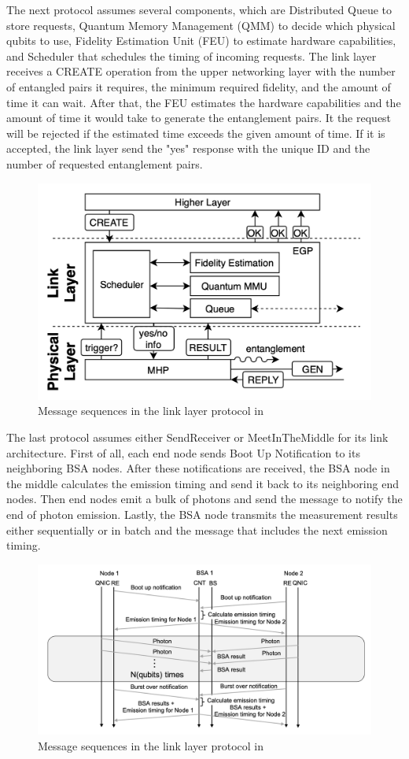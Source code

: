 The next protocol \cite{Dahlberg_2019} assumes several components, which are Distributed Queue to store requests, Quantum Memory Management (QMM) to decide which physical qubits to use, Fidelity Estimation Unit (FEU) to estimate hardware capabilities, and Scheduler that schedules the timing of incoming requests.
The link layer receives a CREATE operation from the upper networking layer with the number of entangled pairs it requires, the minimum required fidelity, and the amount of time it can wait.
After that, the FEU estimates the hardware capabilities and the amount of time it would take to generate the entanglement pairs.  It the request will be rejected if the estimated time exceeds the given amount of time.
If it is accepted, the link layer send the "yes" response with the unique ID and the number of requested entanglement pairs.

\begin{figure}[H]
  \centerline{\includegraphics[width=.5\columnwidth]{images/link_protocol_dahlberg.png}}
  \caption{Message sequences in the link layer protocol in  \cite{Dahlberg_2019}}
\end{figure}

The last protocol \cite{matsuo2019simulation} assumes either SendReceiver or MeetInTheMiddle for its link architecture. First of all, each end node sends Boot Up Notification to its neighboring BSA nodes.
After these notifications are received, the BSA node in the middle calculates the emission timing and send it back to its neighboring end nodes.
Then end nodes emit a bulk of photons and send the message to notify the end of photon emission.
Lastly, the BSA node transmits the measurement results either sequentially or in batch and the message that includes the next emission timing.
\begin{figure}[H]
  \centerline{\includegraphics[width=.5\columnwidth]{images/link_protocol_matsuo.png}}
  \caption{Message sequences in the link layer protocol in \cite{matsuo2019simulation}}
\end{figure}

